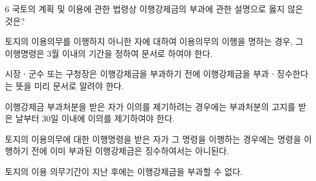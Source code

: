 \begin{question}{6}
국토의 계획 및 이용에 관한 법령상 이행강제금의 부과에 관한 설명으로 옳지 않은 것은?
\begin{choices}
  \item 토지의 이용의무를 이행하지 아니한 자에 대하여 이용의무의 이행을 명하는 경우, 그 이행명령은 3월 이내의 기간을 정하여 문서로 하여야 한다.
  \item 시장ㆍ군수 또는 구청장은 이행강제금을 부과하기 전에 이행강제금을 부과ㆍ징수한다는 뜻을 미리 문서로 알려야 한다.
  \item 이행강제금 부과처분을 받은 자가 이의를 제기하려는 경우에는 부과처분의 고지를 받은 날부터 30일 이내에 이의를 제기하여야 한다.
  \item 토지의 이용의무에 대한 이행명령을 받은 자가 그 명령을 이행하는 경우에는 명령을 이행하기 전에 이미 부과된 이행강제금은 징수하여서는 아니된다.
  \item 토지의 이용 의무기간이 지난 후에는 이행강제금을 부과할 수 없다.
\end{choices}
\end{question}
